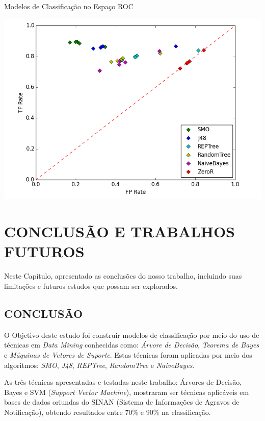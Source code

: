 \documentclass[
	12pt,				%
	openright,			%
	oneside,	
	a4paper,				%
	english,				%
	brazil				%
]{abntex2/abntex2} %
\begin{document}
	\begin{grafico}[!htb]
		\caption{\label{graficoTodosModelos} \fontsize{10}{\baselineskip} \selectfont Modelos de Classificação no Espaço ROC}
		\begin{center}
			\includegraphics[scale=0.6]{python/TodosModelos.png}
		\end{center}
	\end{grafico}
	
\chapter{CONCLUSÃO E TRABALHOS FUTUROS}

	Neste Capítulo, apresentado as conclusões do nosso trabalho, incluindo suas limitações  e futuros estudos que possam ser explorados. 
	\vspace{-1.5\baselineskip}
	\section{CONCLUSÃO}
	\vspace{1\baselineskip}
	O Objetivo deste estudo foi construir modelos de classificação por meio do uso de técnicas em \textit{Data Mining} conhecidas como: \textit{Árvore de Decisão}, \textit{Teorema de Bayes} e \textit{Máquinas de Vetores de Suporte}. Estas técnicas foram aplicadas por meio dos algoritmos: \textit{SMO}, \textit{J48}, \textit{REPTree}, \textit{RandomTree} e \textit{NaiveBayes}.
	
	As três técnicas apresentadas e testadas neste trabalho: Árvores de Decisão, Bayes e SVM (\textit{Support Vector Machine}), mostraram ser técnicas aplicáveis em bases de dados oriundas do SINAN (Sistema de Informações de Agravos de Notificação), obtendo resultados entre 70\% e 90\% na classificação.
	
\end{document}
